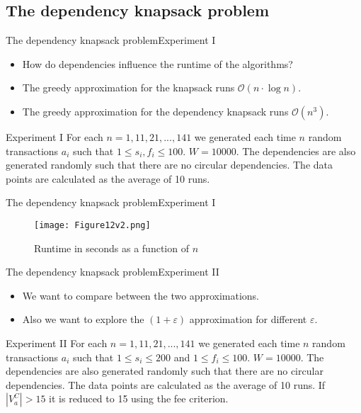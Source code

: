 \documentclass{beamer}
\begin{document}
\subsection* {The dependency knapsack problem}
\begin{frame}{The dependency knapsack problem}{Experiment I} %
    \begin{itemize}
        \item {How do dependencies influence the runtime of the algorithms?}
        \item {The greedy approximation for the knapsack runs 
        $\mathcal{O}(n\cdot\log{n})$.}
        \item {The greedy approximation for the dependency knapsack runs 
        $\mathcal{O}(n^3)$.}
    \end{itemize}
    \begin{block}{Experiment I}
    For each $n=1,11,21,...,141$ we generated each time $n$ random 
    transactions $a_i$ such that $1\leq s_i,f_i\leq 100$. $W=10000$. 
    The dependencies are also generated randomly such that there are no 
    circular dependencies. The data points are calculated as the average of 
    10 runs.
    \end{block}
\end{frame}

\begin{frame}{The dependency knapsack problem}{Experiment I} %
    \begin{figure}
        \centering
        \texttt{[image: Figure12v2.png]}
        \caption{Runtime in seconds as a function of $n$}
    \end{figure}
\end{frame}
\begin{frame}{The dependency knapsack problem}{Experiment II} %
    \begin{itemize}
        \item {We want to compare between the two approximations.}
        \item {Also we want to explore the $(1+\varepsilon)$ approximation 
        for different $\varepsilon$.}    
    \end{itemize}
    \begin{block}{Experiment II}
    For each $n=1,11,21,...,141$ we generated each time $n$ random transactions
    $a_i$ such that $1\leq s_i \leq 200$ and $1\leq f_i\leq 100$. $W=10000$. 
    The dependencies are also generated randomly such that there are no 
    circular dependencies. The data points are calculated as the average of 
    10 runs. If $|V_a^C| > 15$ it is reduced to 15 using the fee criterion.
    \end{block}
\end{frame}
\end{document}
